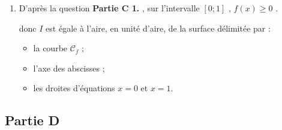 \begin{enumerate}
\begin{enumerate}
			d'où $
			\begin{aligned}[t]
				J & =\Big[ -\e^{-x}\left(2x-3\right)   \Big]_0^{1}-\int_0^{1}   -\e^{-x}\times 2 \,    \d x\\
				& =   -\e^{-1}\left(2\times 1-3\right) + \e^{-0}\left(2 \times 0-3\right)    - 2 \Big[ \e^{-x} \Big]_0^1\\
				& =   -\dfrac{1}{\e} \times (-1) -3 -2 \e^{-1} +2 \e^0 \\
				& =  \dfrac{1}{\e} -3 -2 \dfrac{1}{\e} +2 \\
				& = -1-\dfrac{1}{\e}
			\end{aligned}	$

			D'où $I = 2 + J = 2-1 -\dfrac{1}{\e} = 1-\dfrac{1}{\e}$.

			\item  	D'après la question \textbf{Partie C 1. }, sur l'intervalle $[0;1]$ , $f(x) \geqslant 0$ .

			donc $I$  est égale à l'aire, en unité d'aire, de la surface délimitée par :
			\begin{itemize}[label=\textbullet]
				\item la courbe $\mathcal{C}_{f}$ ;
				\item l'axe des abscisses  ;
				\item les droites d'équations $x=0$ et $x=1$.
			\end{itemize}

		\end{enumerate}
	\end{enumerate}

	\subsection*{Partie D}
	
	
	


